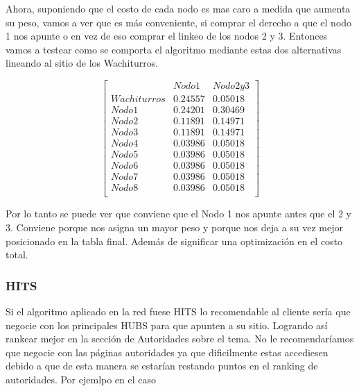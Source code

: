 Ahora, suponiendo que el costo de cada nodo es mas caro a medida que aumenta su peso, vamos a ver que es más conveniente, si comprar el derecho a que el nodo 1 nos apunte o en vez de eso comprar el linkeo de los nodos 2 y 3. Entonces vamos a testear como se comporta el algoritmo mediante estas dos alternativas lineando al sitio de los Wachiturros.


   $$ 
\begin{bmatrix}
 & Nodo 1 & Nodo 2 y 3 \\
Wachiturros & 0.24557  & 0.05018   \\
Nodo 1 & 0.24201& 0.30469\\
Nodo 2 & 0.11891& 0.14971\\
Nodo 3 & 0.11891& 0.14971\\
Nodo 4 & 0.03986  & 0.05018\\
Nodo 5 & 0.03986  & 0.05018\\
Nodo 6 & 0.03986  & 0.05018\\
Nodo 7 & 0.03986 & 0.05018\\
Nodo 8 & 0.03986 & 0.05018\\
\end{bmatrix} 
$$

Por lo tanto se puede ver que conviene que el Nodo 1 nos apunte antes que el 2 y 3. Conviene porque nos asigna un mayor peso y porque nos deja a su vez mejor posicionado en la tabla final. Además de significar una optimización en el costo total.

\subsubsection{HITS}
Si el algoritmo aplicado en la red fuese HITS lo recomendable al cliente sería que negocie con los principales HUBS para que apunten a su sitio. Logrando así rankear mejor en la sección de Autoridades sobre el tema. 
No le recomendaríamos que negocie con las páginas autoridades ya que dificilmente estas accediesen debido a que de esta manera se estarían restando puntos en el ranking de autoridades. Por ejemlpo en el caso
